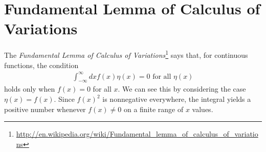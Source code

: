 \chapter{Fundamental Lemma of Calculus of Variations}\label{app:fundamental-lemma-of-calculus-of-variations}

The \textit{Fundamental Lemma of Calculus of Variations}\footnote{\url{http://en.wikipedia.org/wiki/Fundamental_lemma_of_calculus_of_variations}} says that, for continuous functions, the condition
\begin{align}
  \int_{-\infty}^\infty dx f(x)\eta(x)
=
  0
\text{ for all $\eta(x)$}
\end{align}
holds only when $f(x)=0$ for all $x$.
We can see this by considering the case $\eta(x)=f(x)$.
Since $f(x)^2$ is nonnegative everywhere, the integral yields a positive number whenever $f(x)\neq 0$ on a finite range of $x$ values.
